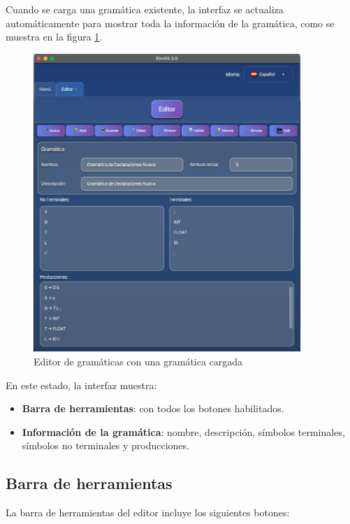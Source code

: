 Cuando se carga una gramática existente, la interfaz se actualiza automáticamente para mostrar toda la información de la gramática, como se muestra en la figura \ref{fig:editor_con_gramatica}.

\needspace{8cm}
\begin{figure}[H]
    \centering
    \includegraphics[width=0.9\textwidth]{figuras/editor/editor.png}
    \caption{Editor de gramáticas con una gramática cargada}
    \label{fig:editor_con_gramatica}
\end{figure}

En este estado, la interfaz muestra:
\begin{itemize}
    \item \textbf{Barra de herramientas}: con todos los botones habilitados.
    \item \textbf{Información de la gramática}: nombre, descripción, símbolos terminales, símbolos no terminales y producciones.
\end{itemize}

\subsection{Barra de herramientas}

La barra de herramientas del editor incluye los siguientes botones:

